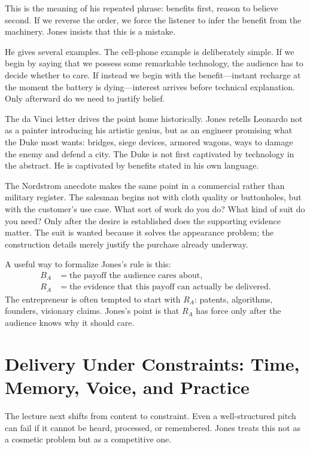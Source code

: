 This is the meaning of his repeated phrase: benefits first, reason to believe second. If we reverse the order, we force the listener to infer the benefit from the machinery. Jones insists that this is a mistake.

He gives several examples. The cell-phone example is deliberately simple. If we begin by saying that we possess some remarkable technology, the audience has to decide whether to care. If instead we begin with the benefit---instant recharge at the moment the battery is dying---interest arrives before technical explanation. Only afterward do we need to justify belief.

The da Vinci letter drives the point home historically. Jones retells Leonardo not as a painter introducing his artistic genius, but as an engineer promising what the Duke most wants: bridges, siege devices, armored wagons, ways to damage the enemy and defend a city. The Duke is not first captivated by technology in the abstract. He is captivated by benefits stated in his own language.

The Nordstrom anecdote makes the same point in a commercial rather than military register. The salesman begins not with cloth quality or buttonholes, but with the customer's use case. What sort of work do you do? What kind of suit do you need? Only after the desire is established does the supporting evidence matter. The suit is wanted because it solves the appearance problem; the construction details merely justify the purchase already underway.

A useful way to formalize Jones's rule is this:
\begin{align}
B_A &= \text{the payoff the audience cares about},\\
R_A &= \text{the evidence that this payoff can actually be delivered}.
\end{align}
The entrepreneur is often tempted to start with \(R_A\): patents, algorithms, founders, visionary claims. Jones's point is that \(R_A\) has force only after the audience knows why it should care.

\section{Delivery Under Constraints: Time, Memory, Voice, and Practice}

The lecture next shifts from content to constraint. Even a well-structured pitch can fail if it cannot be heard, processed, or remembered. Jones treats this not as a cosmetic problem but as a competitive one.

